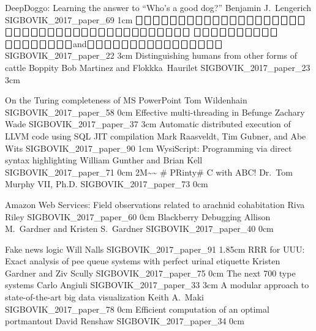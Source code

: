 
\addpaper
	{DeepDoggo: Learning the answer to ``Who's a good dog?''}
	{Benjamin J.\ Lengerich}
	{}
	{SIGBOVIK_2017_paper_69}
	{1cm}
	{}
\addpaper
	{$\bigbox\bigbox\bigbox\bigbox\bigbox\bigbox\bigbox\bigbox\bigbox\bigbox\bigbox\bigbox\bigbox\bigbox$\quad $\bigbox\bigbox\bigbox\bigbox\bigbox\bigbox$\quad $\bigbox\bigbox\bigbox\bigbox$\quad $\bigbox\bigbox\bigbox\bigbox\bigbox$\quad $\bigbox\bigbox\bigbox\bigbox\bigbox$\quad $\bigbox\bigbox$\quad $\bigbox\bigbox\bigbox\bigbox\bigbox\bigbox$}
	{$\bigbox\bigbox\bigbox\bigbox\bigbox\bigbox\bigbox$\quad $\bigbox\bigbox\bigbox$\quad $\bigbox\bigbox\bigbox\bigbox\bigbox\bigbox\bigbox\bigbox$\quad and\quad $\bigbox\bigbox\bigbox\bigbox\bigbox\bigbox\bigbox\bigbox$\quad $\bigbox\bigbox\bigbox\bigbox\bigbox\bigbox\bigbox\bigbox$}
	{}
	{SIGBOVIK_2017_paper_22}
	{3cm}
	{}
\addpaper
	{Distinguishing humans from other forms of cattle}
	{Boppity Bob Martinez and Flokkka\textdegree\ Haurilet}
	{}
	{SIGBOVIK_2017_paper_23}
	{3cm}
	{}

\addpaper
	{On the Turing completeness of MS PowerPoint}
	{Tom Wildenhain}
	{}
	{SIGBOVIK_2017_paper_58}
	{0cm}
	{}
\addpaper
	{Effective multi-threading in Befunge}
	{Zachary Wade}
	{}
	{SIGBOVIK_2017_paper_37}
	{3cm}
	{}
\addpaper
	{Automatic distributed execution of LLVM code using SQL JIT compilation}
	{Mark Raasveldt, Tim Gubner, and Abe Wits}
	{}
	{SIGBOVIK_2017_paper_90}
	{1cm}
	{}
\addpaper
	{WysiScript: Programming via direct syntax highlighting}
	{William Gunther and Brian Kell}
	{}
	{SIGBOVIK_2017_paper_71}
	{0cm}
	{}
\addpaper
	{2M\~{}\~{} \# PRinty\# C with ABC!}
	{Dr.\ Tom Murphy VII, Ph.D.}
	{}
	{SIGBOVIK_2017_paper_73}
	{0cm}
	{}

\addpaper
	{Amazon Web Services: Field observations related to arachnid cohabitation}
	{Riva Riley}
	{}
	{SIGBOVIK_2017_paper_60}
	{0cm}
	{}
\addpaper
	{Blackberry Debugging}
	{Allison M.\ Gardner and Kristen S.\ Gardner}
	{}
	{SIGBOVIK_2017_paper_40}
	{0cm}
	{}

\addpaper
	{Fake news logic}
	{Will Nalls}
	{}
	{SIGBOVIK_2017_paper_91}
	{1.85cm}
	{}
\addpaper
	{RRR for UUU: Exact analysis of pee queue systems with perfect urinal etiquette}
	{Kristen Gardner and Ziv Scully}
	{}
	{SIGBOVIK_2017_paper_75}
	{0cm}
	{}
\addpaper
	{The next 700 type systems}
	{Carlo Angiuli}
	{}
	{SIGBOVIK_2017_paper_33}
	{3cm}
	{}
\addpaper
	{A modular approach to state-of-the-art big data visualization}
	{Keith A.\ Maki}
	{}
	{SIGBOVIK_2017_paper_78}
	{0cm}
	{}
\addpaper
	{Efficient computation of an optimal portmantout}
	{David Renshaw}
	{}
	{SIGBOVIK_2017_paper_34}
	{0cm}
	{}

